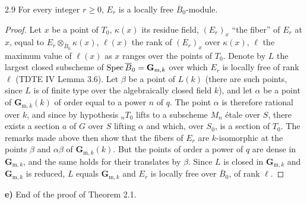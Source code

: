 \begin{lemma}{2.9}\label{XV.2.9}
For every integer $r\geq0$, $E_r$ is a locally free $\overline B_0$-module.
\end{lemma}
\begin{proof}
Let $x$ be a point of $T_0$, $\kappa(x)$ its residue field, $(E_r)_x$ ``the fiber'' of $E_r$ at $x$, equal to $E_r\otimes_{\overline B_0}\kappa(x)$, $\ell(x)$ the rank of $(E_r)_x$ over $\kappa(x)$, $\ell$ the maximum value of $\ell(x)$ as $x$ ranges over the points of $T_0$. Denote by $L$ the largest closed subscheme of $\operatorname{Spec}\overline B_0=\mathbf G_{\mathrm m,k}$ over which $E_r$ is locally free of rank $\ell$ (TDTE IV Lemma 3.6). Let $\beta$ be a point of $L(k)$ (there are such points, since $L$ is of finite type over the algebraically closed field $k$), and let $\alpha$ be a point of $\mathbf G_{\mathrm m,k}(k)$ of order equal to a power $n$ of $q$. The point $\alpha$ is therefore rational over $k$, and since by hypothesis ${}_nT_0$ lifts to a subscheme $M_n$ \'etale over $S$, there exists a section $a$ of $G$ over $S$ lifting $\alpha$ and which, over $S_0$, is a section of $T_0$. The remarks made above then show that the fibers of $E_r$ are $k$-isomorphic at the points $\beta$ and $\alpha\beta$ of $\mathbf G_{\mathrm m,k}(k)$. But the points of order a power of $q$ are dense in $\mathbf G_{\mathrm m,k}$, and the same holds for their translates by $\beta$. Since $L$ is closed in $\mathbf G_{\mathrm m,k}$ and $\mathbf G_{\mathrm m,k}$ is reduced, $L$ equals $\mathbf G_{\mathrm m,k}$ and $E_r$ is locally free over $\overline B_0$, of rank $\ell$.
\end{proof}

\noindent\textbf{e)} End of the proof of Theorem 2.1.
